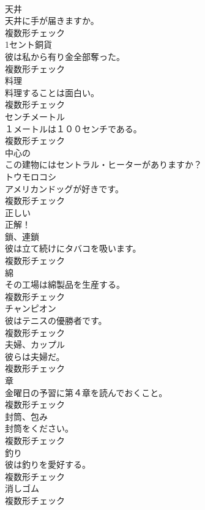 \documentclass[8pt]{extreport}
\begin{document}
\begin{CJK}{UTF8}{min}
\\	[名詞]	天井	
\\	天井に手が届きますか。	
\\	複数形チェック
\\	[名詞]	1セント銅貨	
\\	彼は私から有り金全部奪った。	
\\	複数形チェック
\\	[名詞]	料理	
\\	料理することは面白い。	
\\	複数形チェック
\\	[名詞]	センチメートル	
\\	１メートルは１００センチである。	
\\	複数形チェック
\\	[形容詞]	中心の	
\\	この建物にはセントラル・ヒーターがありますか？	
\\	[名詞]	トウモロコシ	
\\	アメリカンドッグが好きです。	
\\	複数形チェック
\\	[形容詞]	正しい	
\\	正解！	
\\	[名詞]	鎖、連鎖	
\\	彼は立て続けにタバコを吸います。	
\\	複数形チェック
\\	[名詞]	綿	
\\	その工場は綿製品を生産する。	
\\	複数形チェック
\\	[名詞]	チャンピオン	
\\	彼はテニスの優勝者です。	
\\	複数形チェック
\\	[名詞]	夫婦、カップル	
\\	彼らは夫婦だ。	
\\	複数形チェック
\\	[名詞]	章	
\\	金曜日の予習に第４章を読んでおくこと。	
\\	複数形チェック
\\	[名詞]	封筒、包み	
\\	封筒をください。	
\\	複数形チェック
\\	[名詞]	釣り	
\\	彼は釣りを愛好する。	
\\	複数形チェック
\\	[名詞]	消しゴム	
\\	複数形チェック

\end{CJK}
\end{document}

